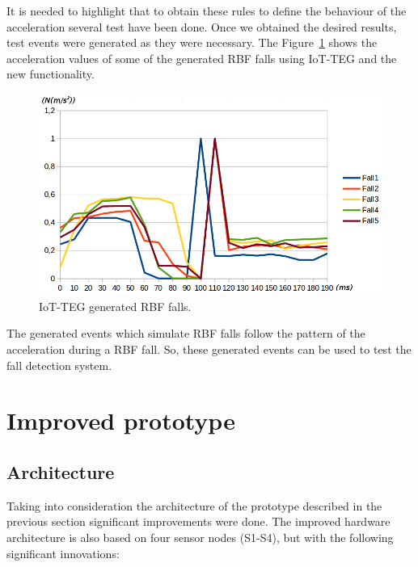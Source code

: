 \documentclass[conference]{IEEEtran}
\theoremstyle{definition}
\begin{document}
It is needed to highlight that to obtain these rules to define the behaviour of the acceleration several test
have been done. Once we obtained the desired results, test events were generated as they were necessary. The 
Figure~\ref{fig:IoTTEGRBFGeneratedEvents} shows the acceleration values of some of the generated RBF falls using
IoT-TEG and the new functionality.

\begin{figure}[!h]
  \centering
  \includegraphics[scale=0.3]{img/IoTTEGRBFGeneratedEvents}
  \caption[IoT-TEG generated RBF falls]{IoT-TEG generated RBF falls.}
  \label{fig:IoTTEGRBFGeneratedEvents}
\end{figure}

The generated events which simulate RBF falls follow the pattern of the acceleration during a RBF fall.
So, these generated events can be used to test the fall detection system.

\section{Improved prototype}
\label{sec:improvedprototype}

\subsection{Architecture}
\label{sub:improvedprototypearchitecture}

Taking into consideration the architecture of the prototype described in the previous 
section significant improvements were done. The improved hardware architecture is also 
based on four sensor nodes (S1-S4), but with the following significant innovations:
\end{document}
